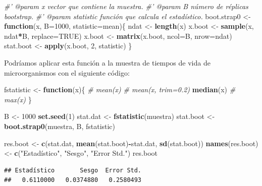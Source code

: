 \documentclass[]{book}
\newenvironment{Shaded}{\begin{snugshade}}{\end{snugshade}}
\newcommand{\KeywordTok}[1]{\textcolor[rgb]{0.13,0.29,0.53}{\textbf{#1}}}
\newcommand{\DataTypeTok}[1]{\textcolor[rgb]{0.13,0.29,0.53}{#1}}
\newcommand{\DecValTok}[1]{\textcolor[rgb]{0.00,0.00,0.81}{#1}}
\newcommand{\StringTok}[1]{\textcolor[rgb]{0.31,0.60,0.02}{#1}}
\newcommand{\CommentTok}[1]{\textcolor[rgb]{0.56,0.35,0.01}{\textit{#1}}}
\newcommand{\OtherTok}[1]{\textcolor[rgb]{0.56,0.35,0.01}{#1}}
\newcommand{\ControlFlowTok}[1]{\textcolor[rgb]{0.13,0.29,0.53}{\textbf{#1}}}
\newcommand{\OperatorTok}[1]{\textcolor[rgb]{0.81,0.36,0.00}{\textbf{#1}}}
\newcommand{\NormalTok}[1]{#1}
\theoremstyle{definition}
\theoremstyle{definition}
\theoremstyle{definition}
\theoremstyle{remark}
\begin{document}
\begin{Shaded}
\begin{Highlighting}[]
\CommentTok{#' @param x vector que contiene la muestra.}
\CommentTok{#' @param B número de réplicas bootstrap.}
\CommentTok{#' @param statistic función que calcula el estadístico.}
\NormalTok{boot.strap0 <-}\StringTok{ }\ControlFlowTok{function}\NormalTok{(x, }\DataTypeTok{B=}\DecValTok{1000}\NormalTok{, }\DataTypeTok{statistic=}\NormalTok{mean)\{}
\NormalTok{  ndat <-}\StringTok{ }\KeywordTok{length}\NormalTok{(x)}
\NormalTok{  x.boot <-}\StringTok{ }\KeywordTok{sample}\NormalTok{(x, ndat}\OperatorTok{*}\NormalTok{B, }\DataTypeTok{replace=}\OtherTok{TRUE}\NormalTok{)}
\NormalTok{  x.boot <-}\StringTok{ }\KeywordTok{matrix}\NormalTok{(x.boot, }\DataTypeTok{ncol=}\NormalTok{B, }\DataTypeTok{nrow=}\NormalTok{ndat)}
\NormalTok{  stat.boot <-}\StringTok{ }\KeywordTok{apply}\NormalTok{(x.boot, }\DecValTok{2}\NormalTok{, statistic)}
\NormalTok{\}}
\end{Highlighting}
\end{Shaded}

Podríamos aplicar esta función a la muestra de tiempos de vida de
microorganismos con el siguiente código:

\begin{Shaded}
\begin{Highlighting}[]
\NormalTok{fstatistic <-}\StringTok{ }\ControlFlowTok{function}\NormalTok{(x)\{}
  \CommentTok{#  mean(x)}
  \CommentTok{#  mean(x, trim=0.2)}
  \KeywordTok{median}\NormalTok{(x)}
  \CommentTok{#  max(x)}
\NormalTok{\}}

\NormalTok{B <-}\StringTok{ }\DecValTok{1000}
\KeywordTok{set.seed}\NormalTok{(}\DecValTok{1}\NormalTok{)}
\NormalTok{stat.dat <-}\StringTok{ }\KeywordTok{fstatistic}\NormalTok{(muestra)}
\NormalTok{stat.boot <-}\StringTok{ }\KeywordTok{boot.strap0}\NormalTok{(muestra, B, fstatistic)}

\NormalTok{res.boot <-}\StringTok{ }\KeywordTok{c}\NormalTok{(stat.dat, }\KeywordTok{mean}\NormalTok{(stat.boot)}\OperatorTok{-}\NormalTok{stat.dat, }\KeywordTok{sd}\NormalTok{(stat.boot))}
\KeywordTok{names}\NormalTok{(res.boot) <-}\StringTok{ }\KeywordTok{c}\NormalTok{(}\StringTok{"Estadístico"}\NormalTok{, }\StringTok{"Sesgo"}\NormalTok{, }\StringTok{"Error Std."}\NormalTok{)}
\NormalTok{res.boot}
\end{Highlighting}
\end{Shaded}

\begin{verbatim}
## Estadístico       Sesgo  Error Std. 
##   0.6110000   0.0374880   0.2580493
\end{verbatim}
\end{document}
